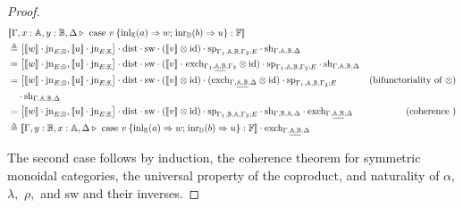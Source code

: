 \documentclass[10pt,a4paper]{amsart}
\theoremstyle{definition}
\theoremstyle{definition}
\theoremstyle{definition}
\theoremstyle{definition}
\theoremstyle{definition}
\theoremstyle{definition}
\begin{document}
\begin{proof}
  \begin{align*}
    & [\![\Gamma,x:\typeA, y:\typeB, \Delta \vljud \text{ case }  v \hspace{2pt}  \{\text{inl}_{\typeE} (a) \Rightarrow w ; \hspace{1pt} \text{inr}_{\typeD} (b) \Rightarrow u\}: \typeF]\!] \\ 
    &\triangleq    \left[ [\![  w]\!] \cdot \text{jn}_{E;\typeD},[\![u]\!]\cdot \text{jn}_{E;\typeE }\right] \cdot \text{dist} \cdot \text{sw}   \cdot ([\![ v  ]\!] \otimes \text{id})  \cdot \text{sp}_{\Gamma_{1},\typeA, \typeB,\Gamma_{2};E} \cdot \text{sh}_{\Gamma,\typeA, \typeB,\Delta} \\
    & =  \left[ [\![  w]\!] \cdot \text{jn}_{E;\typeD},[\![u]\!]\cdot \text{jn}_{E;\typeE }\right] \cdot \text{dist} \cdot \text{sw}  \cdot ([\![v]\! ]\cdot \hspace{1pt} \text{exch}_{\Gamma_{1}, \underline{\typeA,\typeB},\Gamma_{2}} \otimes \text{id}) \cdot \text{sp}_{\Gamma_{1},\typeA, \typeB,\Gamma_{2};E} \cdot \text{sh}_{\Gamma,\typeA, \typeB,\Delta} \\
    &  = \left[ [\![w]\!] \cdot \text{jn}_{E;\typeD},[\![u]\!]\cdot \text{jn}_{E;\typeE }\right]  \cdot \text{dist} \cdot \text{sw}   \cdot ([\![ v ]\!]\otimes \text{id}) \cdot (\text{exch}_{\Gamma,  \underline{\typeA,  \typeB}, \Delta} \otimes \text{id}) \cdot \text{sp}_{\Gamma_{1},\typeA,\typeB, \Gamma_{2};E}  & {\text{(bifunctoriality of $\otimes$)}}\\
    & \hspace{10pt} \cdot  \text{sh}_{\Gamma,\typeA, \typeB,\Delta} \\
    & =   \left[ [\![ w]\!] \cdot \text{jn}_{E;\typeD},[\![u]\!]\cdot \text{jn}_{E;\typeE }\right]  \cdot \text{dist} \cdot \text{sw}  \cdot ([\![v]\!]\otimes \text{id}) \cdot \text{sp}_{\Gamma_{1},\typeB,\typeA, \Gamma_{2};E}  \cdot \text{sh}_{\Gamma,\typeB, \typeA,\Delta}  \cdot \text{exch}_{\Gamma,  \underline{\typeA,\typeB}, \Delta} & {\text{(coherence )}} \\
    & \triangleq   [\![\Gamma,y:\typeB, x:\typeA, \Delta \vljud \text{ case } v \hspace{2pt}  \{\text{inl}_{\typeE} (a) \Rightarrow w ; \hspace{1pt} \text{inr}_{\typeD} (b) \Rightarrow u\}: \typeF]\!] \cdot \text{exch}_{\Gamma,  \underline{\typeA, \typeB}, \Delta}
  \end{align*}


The second case follows by induction, the coherence theorem for symmetric monoidal categories, the universal property of the coproduct, and naturality of $\alpha,$ $\lambda,$ $\rho,$ and $\text{sw}$ and their inverses.


\end{proof}
\end{document}
